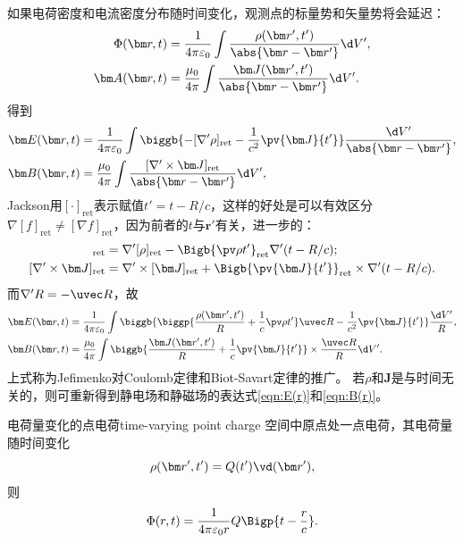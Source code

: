 如果电荷密度和电流密度分布随时间变化，观测点的标量势和矢量势将会延迟：
\begin{subequations}
    \begin{align}
        \Phi(\bm r,t)&=\frac1{4\pi\varepsilon_0}\int\frac{\rho(\bm r',t')}{\abs{\bm r-\bm r'}}\d V',\\
        \bm A(\bm r,t)&=\frac{\mu_0}{4\pi}\int\frac{\bm J(\bm r',t')}{\abs{\bm r-\bm r'}}\d V'.
    \end{align}
\end{subequations}
得到
\begin{subequations}
    \begin{align}
        \bm E(\bm r,t)&=\frac1{4\pi\varepsilon_0}\int\biggb{-[\nabla'\rho]_\ret-\frac1{c^2}\pv{\bm J}{t'}}\frac{\d V'}{\abs{\bm r-\bm r'}},\\
        \bm B(\bm r,t)&=\frac{\mu_0}{4\pi}\int\frac{[\nabla'\times\bm J]_\ret}{\abs{\bm r-\bm r'}}\d V',
    \end{align}
\end{subequations}
Jackson用$[\cdot]_\text{ret}$表示赋值$t'=t-R/c$，这样的好处是可以有效区分$\nabla[f]_\text{ret}\neq[\nabla f]_\text{ret}$，因为前者的$t$与$\bm r'$有关，进一步的：
\begin{align*}
    [\nabla'\rho]_\text{ret}&=\nabla'[\rho]_\text{ret}-\Bigb{\pv\rho{t'}}_\text{ret}\nabla'(t-R/c);\\
    [\nabla'\times\bm J]_\text{ret}&=\nabla'\times[\bm J]_\text{ret}+\Bigb{\pv{\bm J}{t'}}_\text{ret}\times\nabla'(t-R/c).
\end{align*}
而$\nabla'R=-\uvec R$，故
\begin{subequations}
    \begin{align}
        \bm E(\bm r,t)&=\frac1{4\pi\varepsilon_0}\int\biggb{\biggp{\frac{\rho(\bm r',t')}R+\frac1c\pv\rho{t'}}\uvec R-\frac1{c^2}\pv{\bm J}{t'}}\frac{\d V'}R,\\
        \bm B(\bm r,t)&=\frac{\mu_0}{4\pi}\int\biggb{\frac{\bm J(\bm r',t')}R+\frac1c\pv{\bm J}{t'}}\times\frac{\uvec R}R\d V'.
    \end{align}
\end{subequations}
上式称为Jefimenko对Coulomb定律和Biot-Savart定律的推广。
若$\rho$和$\bm J$是与时间无关的，则可重新得到静电场和静磁场的表达式\eqref{eqn:E(r)}和\eqref{eqn:B(r)}。
\begin{example}{电荷量变化的点电荷}{time-varying point charge}
    空间中原点处一点电荷，其电荷量随时间变化
    \[
        \rho(\bm r',t')=Q(t')\vd(\bm r'),
    \]
    则
    \[
        \Phi(r,t)=\frac1{4\pi\varepsilon_0r}Q\Bigp{t-\frac rc}.
    \]
\end{example}
